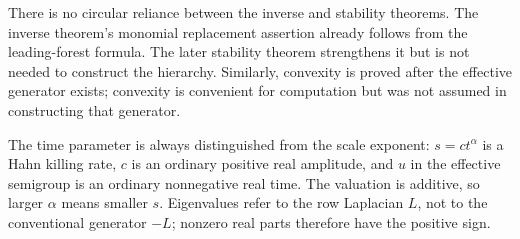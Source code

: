 \documentclass[11pt]{article}
\numberwithin{equation}{section}
\theoremstyle{definition}
\theoremstyle{remark}
\begin{document}
There is no circular reliance between the inverse and stability theorems. The
inverse theorem's monomial replacement assertion already follows from the
leading-forest formula. The later stability theorem strengthens it but is not
needed to construct the hierarchy. Similarly, convexity is proved after the
effective generator exists; convexity is convenient for computation but was not
assumed in constructing that generator.

The time parameter is always distinguished from the scale exponent:
$s=ct^\alpha$ is a Hahn killing rate, $c$ is an ordinary positive real amplitude,
and $u$ in the effective semigroup is an ordinary nonnegative real time. The
valuation is additive, so larger $\alpha$ means smaller $s$. Eigenvalues refer
to the row Laplacian $L$, not to the conventional generator $-L$; nonzero real
parts therefore have the positive sign.
\end{document}
